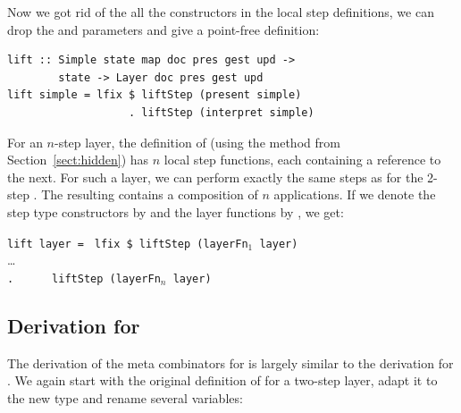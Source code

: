 \documentclass[preprint,natbib]{sigplanconf}
\begin{document}
Now we got rid of the all the constructors in the local step definitions, we can drop the  and  parameters and give a point-free definition:

\begin{small} %
\begin{verbatim}
lift :: Simple state map doc pres gest upd ->
        state -> Layer doc pres gest upd
lift simple = lfix $ liftStep (present simple) 
                   . liftStep (interpret simple)
\end{verbatim}%
\end{small}



For an $n$-step layer, the definition of  (using the method from Section~\ref{sect:hidden}) has $n$ local step functions, each  containing a reference to the next. \bc {} \ec For such a layer, we can perform exactly the same steps as for the 2-step . The resulting  contains a composition of $n$  applications. If we denote the step type constructors by  and the layer functions by , we get:

\begin{small}
\begin{tabbing}
{\tt lift layer = } \= {\tt lfix \$ liftStep (layerFn$_1$ layer)} \\
                    \>       \dots \\
                    \> {\tt .~~~~~~liftStep (layerFn$_n$ layer)}\\
\end{tabbing}%
\end{small}



%																
\subsection{Derivation for } \label{subsubsectcombine}


The derivation of the meta combinators for  is largely similar to the derivation for . We again start with the original definition of  for a two-step layer, adapt it to the new  type and rename several variables:
\end{document}
